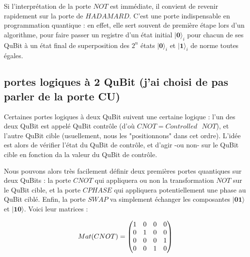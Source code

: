 \documentclass[a4paper,12pt]{report}
\newcommand{\quSt}[1]{\bm{|#1\rangle}}
\begin{document}
\vspace{1\baselineskip}

\par{
	Si l'interprétation de la porte $NOT$ est immédiate, il convient de revenir rapidement sur la porte de $HADAMARD$. C'est une porte indispensable en programmation quantique : en effet, elle sert souvent de première étape lors d'un algorithme, pour faire passer un registre d'un état initial $\quSt{0}_i$ pour chacun de ses QuBit à un état final de superposition des $2^n$ états $\quSt{0}_i$ et $\quSt{1}_i$ de norme toutes égales.
}

		\subsection{portes logiques à 2 QuBit (j'ai choisi de pas parler de la porte CU)}

\par{
	Certaines portes logiques à deux QuBit suivent une certaine logique : l'un des deux QuBit est appelé QuBit contrôle (d'où $CNOT = Controlled \text{ } NOT$), et l'autre QuBit cible (usuellement, nous les "positionnons" dans cet ordre). L'idée est alors de vérifier l'état du QuBit de contrôle, et d'agir -ou non- sur le QuBit cible en fonction da la valeur du QuBit de contrôle.
}

\vspace{1\baselineskip}

\par{
	Nous pouvons alors très facilement définir deux premières portes quantiques sur deux QuBits : la porte $CNOT$ qui appliquera ou non la transformation $NOT$ sur le QuBit cible, et la porte $CPHASE$ qui appliquera potentiellement une phase au QuBit ciblé. Enfin, la porte $SWAP$ va simplement échanger les composantes $\quSt{01}$ et $\quSt{10}$. Voici leur matrices :
}

\begin{equation}
	 Mat(CNOT) = \left( \begin{matrix} 1 & 0 & 0 & 0 \\ 0 & 1 & 0 & 0 \\ 0 & 0 & 0 & 1 \\ 0 & 0 & 1 & 0 \\ \end{matrix} \right ) \\
\end{equation}

\vspace{1\baselineskip}
\end{document}
